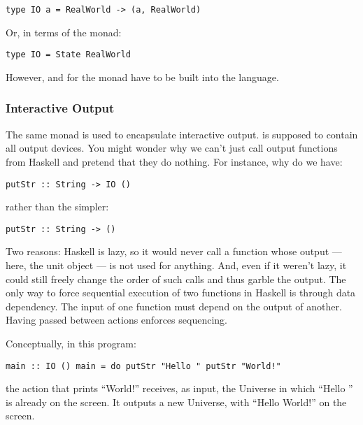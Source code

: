 \begin{verbatim}
type IO a = RealWorld -> (a, RealWorld)
\end{verbatim}

Or, in terms of the  monad:

\begin{verbatim}
type IO = State RealWorld
\end{verbatim}

However, \code{\textgreater{}=\textgreater{}} and  for
the  monad have to be built into the language.

\subsubsection{Interactive Output}\label{interactive-output}

The same  monad is used to encapsulate interactive output.
 is supposed to contain all output devices. You might
wonder why we can't just call output functions from Haskell and pretend
that they do nothing. For instance, why do we have:

\begin{verbatim}
putStr :: String -> IO ()
\end{verbatim}

rather than the simpler:

\begin{verbatim}
putStr :: String -> ()
\end{verbatim}

Two reasons: Haskell is lazy, so it would never call a function whose
output --- here, the unit object --- is not used for anything. And, even
if it weren't lazy, it could still freely change the order of such calls
and thus garble the output. The only way to force sequential execution
of two functions in Haskell is through data dependency. The input of one
function must depend on the output of another. Having 
passed between  actions enforces sequencing.

Conceptually, in this program:

\begin{verbatim}
main :: IO () main = do putStr "Hello " putStr "World!"
\end{verbatim}

the action that prints ``World!'' receives, as input, the Universe in
which ``Hello '' is already on the screen. It outputs a new Universe,
with ``Hello World!'' on the screen.

